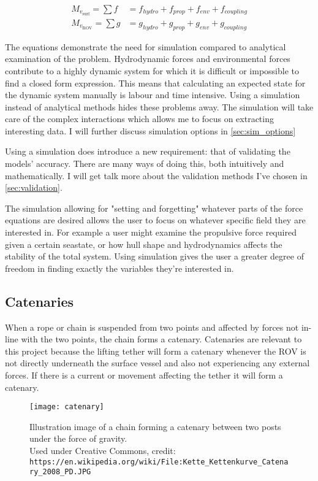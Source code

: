 \begin{align}
M_{v_{\text{surf}}} = \sum f &= f_{hydro} + f_{prop} + f_{env} + f_ {coupling} \label{eq:usv}\\
M_{v_{\text{ROV}}} = \sum g &= g_{hydro} + g_{prop} + g_{env} + g_ {coupling} \label{eq:rov}
\end{align}

The equations demonstrate the need for simulation compared to analytical examination of the problem. Hydrodynamic forces and environmental forces contribute to a highly dynamic system for which it is difficult or impossible to find a closed form expression. This means that calculating an expected state for the dynamic system manually is labour and time intensive. Using a simulation instead of analytical methods hides these problems away. The simulation will take care of the complex interactions which allows me to focus on extracting interesting data. I will further discuss simulation options in \cref{sec:sim_options}

Using a simulation does introduce a new requirement: that of validating the models' accuracy. There are many ways of doing this, both intuitively and mathematically. I will get talk more about the validation methods I've chosen in \cref{sec:validation}. 

The simulation allowing for "setting and forgetting" whatever parts of the force equations are desired allows the user to focus on whatever specific field they are interested in. For example a user might examine the propulsive force required given a certain seastate, or how hull shape and hydrodynamics affects the stability of the total system. Using simulation gives the user a greater degree of freedom in finding exactly the variables they're interested in.

\subsection{Catenaries}
\label{sec:catenary}
When a rope or chain is suspended from two points and affected by forces not in-line with the two points, the chain forms a catenary. Catenaries are relevant to this project because the lifting tether will form a catenary whenever the ROV is not directly underneath the surface vessel and also not experiencing any external forces. If there is a current or movement affecting the tether it will form a catenary. 

\begin{figure}
	\centering
	\texttt{[image: catenary]}
	\caption{Illustration image of a chain forming a catenary between two posts under the force of gravity.\\\scriptsize{Used under Creative Commons, credit: \texttt{https://en.wikipedia.org/wiki/File:Kette\_Kettenkurve\_Catenary\_2008\_PD.JPG}}}
	\label{fig:catenary}
\end{figure}

